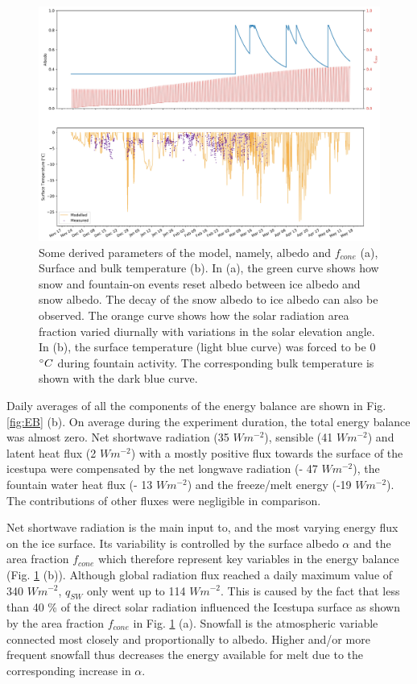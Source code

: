 \documentclass[utf8]{frontiersSCNS} %
\begin{document}
\begin{figure} 
    \centering
    \includegraphics[width=15 cm]{Figures/albedo_temperature.jpg} 
\caption{Some derived parameters of the model, namely, albedo and $f_{cone}$ (a), Surface and bulk temperature (b). In
    (a), the green curve shows how snow and fountain-on events reset albedo between ice albedo and snow albedo.  The
    decay of the snow albedo to ice albedo can also be observed. The orange curve shows how the solar radiation area
    fraction varied diurnally with variations in the solar elevation angle. In (b), the surface temperature (light blue
    curve) was forced to be 0 $\degree C$ during fountain activity. The corresponding bulk temperature is shown with the
    dark blue curve.} 
\label{fig:derived} 
\end{figure}
  

Daily averages of all the components of the energy balance are shown in Fig.  \ref{fig:EB} (b). On average during the
experiment duration, the total energy balance was almost zero. Net shortwave radiation (35 $Wm^{-2}$), sensible (41
$Wm^{-2}$) and latent heat flux (2 $Wm^{-2}$) with a mostly positive flux towards the surface of the icestupa were
compensated by the net longwave radiation (- 47 $Wm^{-2}$), the fountain water heat flux (- 13 $Wm^{-2}$) and the
freeze/melt energy (-19 $Wm^{-2}$). The contributions of other fluxes were negligible in comparison.

Net shortwave radiation is the main input to, and the most varying energy flux on the ice surface. Its variability is
controlled by the surface albedo $\alpha$ and the area fraction $f_{cone}$ which therefore represent key variables in
the energy balance (Fig. \ref{fig:derived} (b)). Although global radiation flux reached a daily maximum value of 340
$Wm^{-2}$, $q_{SW}$ only went up to 114 $Wm^{-2}$. This is caused by the fact that less than 40 \% of the direct solar
radiation influenced the Icestupa surface as shown by the area fraction $f_{cone}$ in Fig. \ref{fig:derived} (a).
Snowfall is the atmospheric variable connected most closely and proportionally to albedo.  Higher and/or more frequent
snowfall thus decreases the energy available for melt due to the corresponding increase in $\alpha$. 
\end{document}

